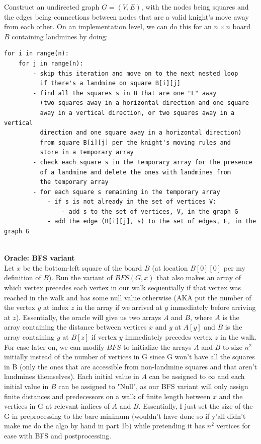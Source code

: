 \documentclass[11pt]{article}
\begin{document}
\begin{enumerate}
\begin{enumerate}
Construct an undirected graph $G = (V,E)$, with the nodes being squares and the edges being connections between nodes that are a valid knight's move away from each other. On an implementation level, we can do this for an $n \times n$ board $B$ containing landmines by doing: \\

\begin{verbatim}
for i in range(n): 
    for j in range(n): 
        - skip this iteration and move on to the next nested loop 
          if there's a landmine on square B[i][j]
        - find all the squares s in B that are one "L" away 
          (two squares away in a horizontal direction and one square 
          away in a vertical direction, or two squares away in a vertical 
          direction and one square away in a horizontal direction) 
          from square B[i][j] per the knight's moving rules and 
          store in a temporary array
        - check each square s in the temporary array for the presence 
          of a landmine and delete the ones with landmines from 
          the temporary array
        - for each square s remaining in the temporary array 
            - if s is not already in the set of vertices V:
                - add s to the set of vertices, V, in the graph G
            - add the edge (B[i][j], s) to the set of edges, E, in the graph G
\end{verbatim} \\

\textbf{Oracle: BFS variant} \\
Let $x$ be the bottom-left square of the board $B$ (at location $B[0][0]$ per my definition of $B$). Run the variant of $BFS(G, x)$ that also makes an array of which vertex precedes each vertex in our walk sequentially if that vertex was reached in the walk and has some null value otherwise (AKA put the number of the vertex $y$ at index $z$ in the array if we arrived at $y$ immediately before arriving at $z$). Essentially, the oracle will give us two arrays $A$ and $B$, where $A$ is the array containing the distance between vertices $x$ and $y$ at $A[y]$ and $B$ is the array containing $y$ at $B[z]$ if vertex $y$ immediately precedes vertex $z$ in the walk. For ease later on, we can modify $BFS$ to initialize the arrays $A$ and $B$ to size $n^2$ initially instead of the number of vertices in G since G won't have all the squares in B (only the ones that are accessible from non-landmine squares and that aren't landmines themselves). Each initial value in $A$ can be assigned to $\infty$ and each initial value in $B$ can be assigned to "Null", as our BFS variant will only assign finite distances and predecessors on a walk of finite length between $x$ and the vertices in G at relevant indices of $A$ and $B$. Essentially, I just set the size of the G in preprocessing to the bare minimum (wouldn't have done so if y'all didn't make me do the algo by hand in part 1b) while pretending it has $n^2$ vertices for ease with BFS and postprocessing.\\


\end{enumerate}
\end{enumerate}
\end{document}
